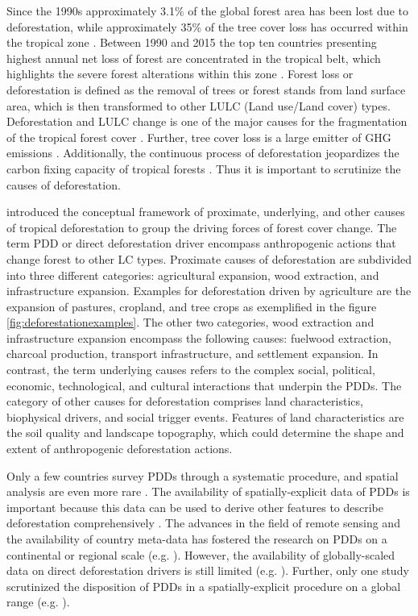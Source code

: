	Since the 1990s approximately 3.1\% of the global forest area has been lost due to deforestation, while approximately 35\% of the tree cover loss has occurred within the tropical zone \citep{FAO2016}. Between 1990 and 2015 the top ten countries presenting highest annual net loss of forest are concentrated in the tropical belt, which highlights the severe forest alterations within this zone \citep{FAO2010,FAO2016}. Forest loss or deforestation is defined as the removal of trees or forest stands from land surface area, which is then transformed to other LULC (Land use/Land cover) types. Deforestation and LULC change is one of the major causes for the fragmentation of the tropical forest cover \citep{Taubert2018}. Further, tree cover loss is a large emitter of \ac{GHG} emissions \citep{Don2010,Baccini2012}. Additionally, the continuous process of deforestation jeopardizes the carbon fixing capacity of tropical forests \citep{Baccini2017}. Thus it is important to scrutinize the causes of deforestation.

	\citet{Geist2001} introduced the conceptual framework of proximate, underlying, and other causes of tropical deforestation to group the driving forces of forest cover change. The term \ac{PDD} or direct deforestation driver encompass anthropogenic actions that change forest to other \ac{LC} types. Proximate causes of deforestation are subdivided into three different categories: agricultural expansion, wood extraction, and infrastructure expansion. Examples for deforestation driven by agriculture are the expansion of pastures, cropland, and tree crops as exemplified in the figure \ref{fig:deforestationexamples}. The other two categories, wood extraction and infrastructure expansion encompass the following causes: fuelwood extraction, charcoal production, transport infrastructure, and settlement expansion. In contrast, the term underlying causes refers to the complex social, political, economic, technological, and cultural interactions that underpin the \acp{PDD}. The category of other causes for deforestation comprises land characteristics, biophysical drivers, and social trigger events. Features of land characteristics are the soil quality and landscape topography, which could determine the shape and extent of anthropogenic deforestation actions.

	Only a few countries survey \acp{PDD} through a systematic procedure, and spatial analysis are even more rare \citep{Sy2015,Hosonuma2012}. The availability of spatially-explicit data of \acp{PDD} is important because this data can be used to derive other features to describe deforestation comprehensively \citep{Hosonuma2012}. The advances in the field of remote sensing and the availability of country meta-data has fostered the research on \acp{PDD} on a continental or regional scale (e.g. \citet{Sy2015,Austin2019,Zalles2018,Meyfroidt2013,Caldas2013,Graesser2015,Ruf2014,Connette2016,Barima2016,Furumo2017,Vijay2018}). However, the availability of globally-scaled data on direct deforestation drivers is still limited (e.g. \citet{Curtis2018,Hosonuma2012,Geist2002,DeFries2010,Carter2018}). Further, only one study scrutinized the disposition of \acp{PDD} in a spatially-explicit procedure on a global range (e.g. \citet{Curtis2018}).

